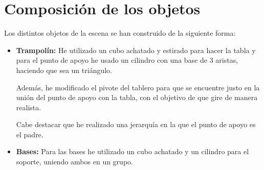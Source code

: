 \section{Composición de los objetos}

Los distintos objetos de la escena se han construido de la siguiente forma:

\begin{itemize}
    \item \textbf{Trampolín: }He utilizado un cubo achatado y estirado para hacer la tabla y para el punto de apoyo he usado un cilindro con una base de 3 aristas, haciendo que sea un triángulo.

    Además, he modificado el pivote del tablero para que se encuentre justo en la unión del punto de apoyo con la tabla, con el objetivo de que gire de manera realista.

    Cabe destacar que he realizado una jerarquía en la que el punto de apoyo es el padre.

    \item \textbf{Bases: }Para las bases he utilizado un cubo achatado y un cilindro para el soporte, uniendo ambos en un grupo.
\end{itemize}
